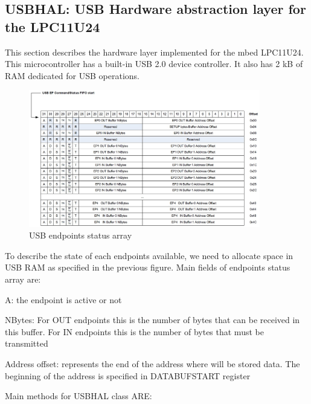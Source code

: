 \documentclass[pdftex,10pt,a4paper]{report}
\newenvironment{packed_item}{
\begin{itemize}
  \setlength{\itemsep}{1pt}
  \setlength{\parskip}{0pt}
  \setlength{\parsep}{0pt}
}{\end{itemize}}
\begin{document}
\subsection{USBHAL: USB Hardware abstraction layer for the LPC11U24}
This section describes the hardware layer implemented for the mbed LPC11U24. This microcontroller has a built-in USB 2.0 device controller. It also has 2 kB of RAM dedicated for USB operations.

\begin{figure}[h!]
		\centering
		\includegraphics[width=0.9\textwidth]{./usb_endpoints.jpg}
		\caption{USB endpoints status array}
		\label{USB endpoints status array}
\end{figure}

To describe the state of each endpoints available, we need to allocate space in USB RAM as specified in the previous figure. Main fields of endpoints status array are:
\begin{packed_item}
	\item A: the endpoint is active or not
	\item NBytes: For OUT endpoints this is the number of bytes that can be received in this buffer. For IN endpoints this is the number of bytes that must be transmitted
	\item Address offset: represents the end of the address where will be stored data. The beginning of the address is specified in DATABUFSTART register 
\end{packed_item}



Main methods for USBHAL class ARE:
\end{document}
